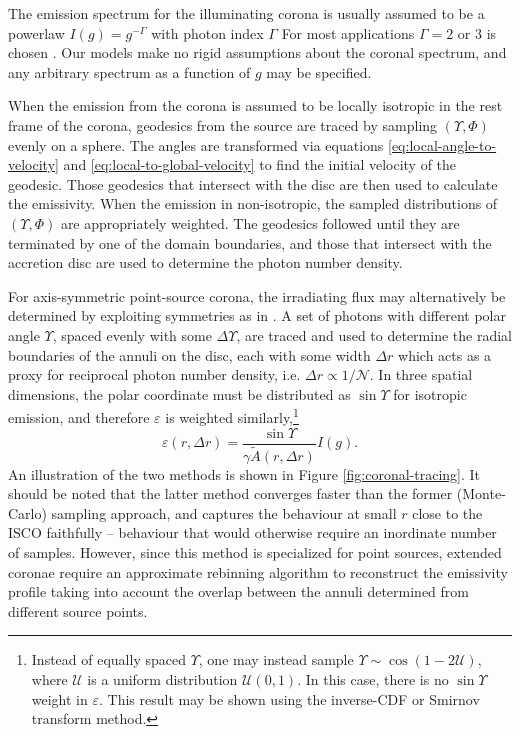 \documentclass[fleqn,usenatbib]{mnras}
\begin{document}
The emission spectrum for the illuminating corona is usually assumed to be a
powerlaw $I(g) = g^{-\Gamma}$ with photon index $\Gamma$ For most applications
$\Gamma = 2$ or $3$ is chosen \citep{mushotzky_agn_pl_1982,remillard_binaries_2006}. Our models make no rigid assumptions
about the coronal spectrum, and any arbitrary spectrum as a function of $g$ may
be specified.

When the emission from the corona is assumed to be locally isotropic in the rest
frame of the corona, geodesics from the source are traced by sampling
$(\Upsilon, \Phi)$ evenly on a sphere. The angles are transformed via equations
\eqref{eq:local-angle-to-velocity} and \eqref{eq:local-to-global-velocity} to
find the initial velocity of the geodesic. Those geodesics that intersect with
the disc are then used to calculate the emissivity. When the emission in
non-isotropic, the sampled distributions of $(\Upsilon, \Phi)$ are appropriately
weighted. The geodesics followed until they are terminated by one of the domain
boundaries, and those that intersect with the accretion disc are used to
determine the photon number density.

For axis-symmetric point-source corona, the irradiating flux may alternatively
be determined by exploiting symmetries as in \cite{dauser_irradiation_2013}. A
set of photons with different polar angle $\Upsilon$, spaced evenly with some
$\Delta \Upsilon$, are traced and used to determine the radial boundaries of the
annuli on the disc, each with some width $\Delta r$ which acts as a proxy for
reciprocal photon number density, i.e. $\Delta r \propto 1 / \mathcal{N}$. In
three spatial dimensions, the polar coordinate must be distributed as $\sin
\Upsilon$ for isotropic emission, and therefore $\varepsilon$ is weighted
similarly,\footnote{Instead of equally spaced $\Upsilon$, one may instead sample
$\Upsilon \sim \cos (1 - 2 \mathcal{U})$, where $\mathcal{U}$ is a uniform
distribution $\mathcal{U}(0,1)$. In this case, there is no $\sin \Upsilon$
weight in $\varepsilon$. This result may be shown using the inverse-CDF or
Smirnov transform method.}
\begin{equation}
    \varepsilon(r, \Delta r) = \frac{\sin \Upsilon}{\gamma \tilde{A}(r, \Delta r)} I(g).
\end{equation}
An illustration of the two methods is shown in Figure \ref{fig:coronal-tracing}.
It should be noted that the latter method converges faster than the
former (Monte-Carlo) sampling approach, and captures the behaviour at small $r$
close to the ISCO faithfully -- behaviour that would otherwise require an
inordinate number of samples. However, since this method is specialized for
point sources, extended coronae require an approximate rebinning algorithm to
reconstruct the emissivity profile taking into account the overlap between the
annuli determined from different source points.
\end{document}
